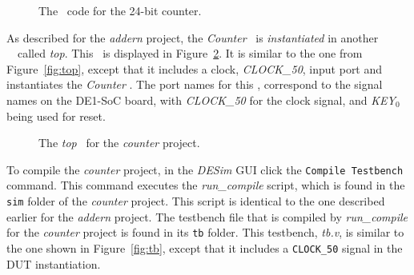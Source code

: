 \begin{figure}[h]
\begin{center}
\begin{minipage}[h]{15 cm}
	{}
	{}
\end{minipage}
	\caption{The \hdlName~code for the 24-bit counter.}
	\label{fig:counter}
\end{center}
\end{figure}

As described for the {\it addern} project, the {\it Counter} \hdlModuleName~is {\it instantiated}
in another \hdlName~\hdlModuleName~called {\it top}. This \hdlModuleName~is displayed in 
Figure~\ref{fig:counter_top}. It is similar to the one from Figure~\ref{fig:top}, except that 
it includes a clock, {\it CLOCK\_50}, input port and instantiates the {\it Counter} \hdlModuleName.
The port names for this \hdlModuleName, correspond to the signal names on the DE1-SoC board, 
with {\it CLOCK\_50} for the clock signal, and {\it KEY}$_0$ being used for reset.

\begin{figure}[h]
\begin{center}
\begin{minipage}[h]{15 cm}
	{}
	{}
\end{minipage}
	\caption{The {\it top} \hdlModuleName~for the {\it counter} project.}
	\label{fig:counter_top}
\end{center}
\end{figure}

To compile the {\it counter} project, in the {\it DESim} GUI click the \texttt{Compile Testbench}
command. This command executes the {\it run\_compile} script, which
is found in the \texttt{sim} folder of the {\it counter} project. This script 
is identical to the one described earlier for the {\it addern} project. 
The testbench file that is compiled by {\it run\_compile} for the {\it counter} project is  
found in its \texttt{tb} folder. This testbench, {\it tb.v}, is similar to the one shown 
in Figure~\ref{fig:tb}, except that it includes a \texttt{CLOCK\_50} signal in the DUT instantiation.

